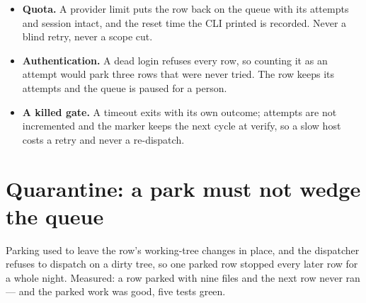 \begin{itemize}
	\item \textbf{Quota.} A provider limit puts the row back on the queue with its attempts and
	session intact, and the reset time the CLI printed is recorded. Never a blind retry, never
	a scope cut.
	\item \textbf{Authentication.} A dead login refuses every row, so counting it as an attempt
	would park three rows that were never tried. The row keeps its attempts and the queue is
	paused for a person.
	\item \textbf{A killed gate.} A timeout exits with its own outcome; attempts are not
	incremented and the marker keeps the next cycle at verify, so a slow host costs a retry and
	never a re-dispatch.
\end{itemize}

\begin{center}
\end{center}

\section{Quarantine: a park must not wedge the queue}

Parking used to leave the row's working-tree changes in place, and the dispatcher refuses to
dispatch on a dirty tree, so one parked row stopped every later row for a whole night.
Measured: a row parked with nine files and the next row never ran --- and the parked work was
good, five tests green.

